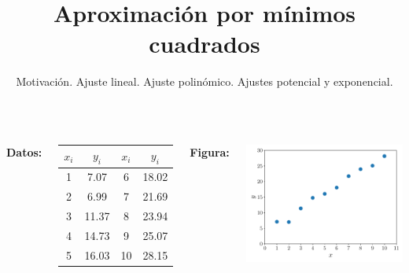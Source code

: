 \documentclass[9pt, aspectratio=169]{beamer}
\title{Aproximación por mínimos cuadrados}
\subtitle{Motivación. Ajuste lineal. Ajuste polinómico. Ajustes potencial y exponencial.}
\begin{document}
\maketitle

\begin{frame}
\begin{columns}[t]
\textbf{Datos:}

\begin{center}
\begin{tabular}{cccc}
\toprule
$x_i$ & $y_i$ & $x_i$ & $y_i$ \\
\midrule
 1 & 7.07 &  6 & 18.02 \\
 2 & 6.99 &  7 & 21.69 \\
 3 & 11.37 &  8 & 23.94 \\
 4 & 14.73 &  9 & 25.07 \\
 5 & 16.03 & 10 & 28.15 \\
\bottomrule
\end{tabular}
\end{center}

\textbf{Figura:}
\begin{center}
    \includegraphics[scale=0.40]{figs/fig-01.pdf}
\end{center}
\end{columns}
\end{frame}
\end{document}
